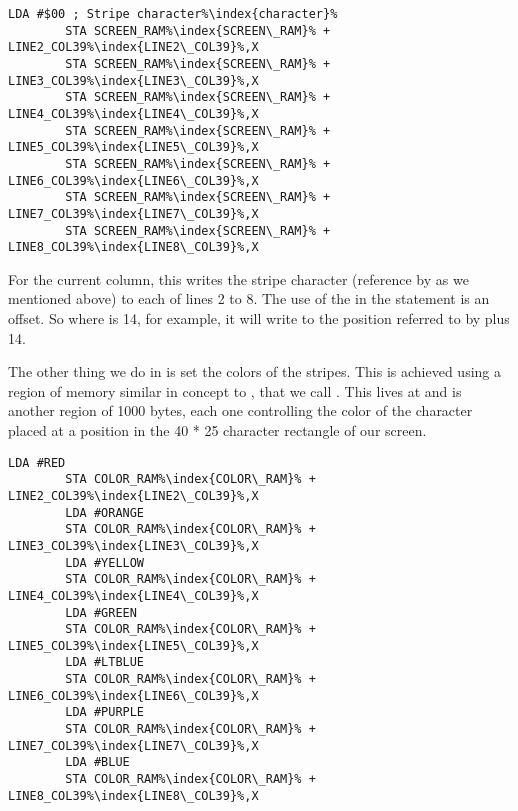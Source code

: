 \begin{lstlisting}[caption=In \icode{DrawStripesBehindTitle\index{DrawStripesBehindTitle}},escapechar=\%]
        LDA #$00 ; Stripe character%\index{character}%
        STA SCREEN_RAM%\index{SCREEN\_RAM}% + LINE2_COL39%\index{LINE2\_COL39}%,X
        STA SCREEN_RAM%\index{SCREEN\_RAM}% + LINE3_COL39%\index{LINE3\_COL39}%,X
        STA SCREEN_RAM%\index{SCREEN\_RAM}% + LINE4_COL39%\index{LINE4\_COL39}%,X
        STA SCREEN_RAM%\index{SCREEN\_RAM}% + LINE5_COL39%\index{LINE5\_COL39}%,X
        STA SCREEN_RAM%\index{SCREEN\_RAM}% + LINE6_COL39%\index{LINE6\_COL39}%,X
        STA SCREEN_RAM%\index{SCREEN\_RAM}% + LINE7_COL39%\index{LINE7\_COL39}%,X
        STA SCREEN_RAM%\index{SCREEN\_RAM}% + LINE8_COL39%\index{LINE8\_COL39}%,X
\end{lstlisting}

For the current column, this writes the stripe character (reference by  as we mentioned above) to each of lines
2 to 8. The use of the  in the  statement is an offset. So where  is 14, for example,
it will write to the position referred to by  plus 14.



The other thing we do in  is set the colors of the stripes. This is achieved using a region of memory
similar in concept to , that we call . This lives at  and is another 
region of 1000 bytes, each one controlling the color of the character placed at a position in the 40 * 25 character rectangle
of our screen.

\begin{lstlisting}[caption=In \icode{DrawStripesBehindTitle\index{DrawStripesBehindTitle}},escapechar=\%]
        LDA #RED
        STA COLOR_RAM%\index{COLOR\_RAM}% + LINE2_COL39%\index{LINE2\_COL39}%,X
        LDA #ORANGE
        STA COLOR_RAM%\index{COLOR\_RAM}% + LINE3_COL39%\index{LINE3\_COL39}%,X
        LDA #YELLOW
        STA COLOR_RAM%\index{COLOR\_RAM}% + LINE4_COL39%\index{LINE4\_COL39}%,X
        LDA #GREEN
        STA COLOR_RAM%\index{COLOR\_RAM}% + LINE5_COL39%\index{LINE5\_COL39}%,X
        LDA #LTBLUE
        STA COLOR_RAM%\index{COLOR\_RAM}% + LINE6_COL39%\index{LINE6\_COL39}%,X
        LDA #PURPLE
        STA COLOR_RAM%\index{COLOR\_RAM}% + LINE7_COL39%\index{LINE7\_COL39}%,X
        LDA #BLUE
        STA COLOR_RAM%\index{COLOR\_RAM}% + LINE8_COL39%\index{LINE8\_COL39}%,X
\end{lstlisting}

